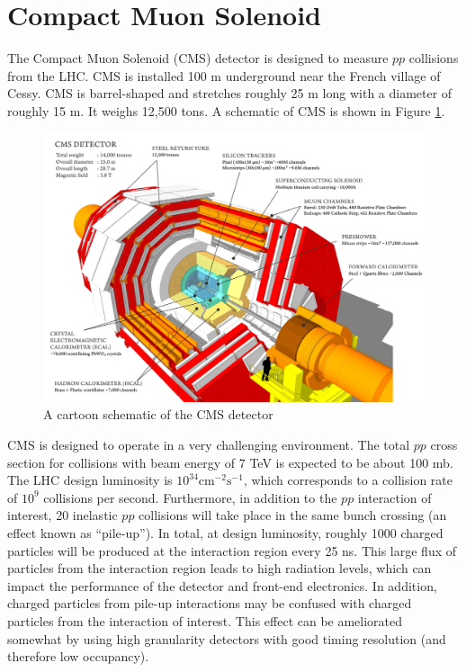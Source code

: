 \section{Compact Muon Solenoid}
\label{ch:cms}

The Compact Muon Solenoid (CMS) detector is 
designed to measure $pp$ collisions from the LHC.
CMS is installed 100 m underground near the French village
of Cessy.  CMS is barrel-shaped and stretches roughly 25 m long with
a diameter of roughly 15 m.  It weighs 12,500 tons.
A schematic of CMS is shown in Figure \ref{fig:cms}.

\begin{figure}
  \centering
  \includegraphics[width=\textwidth]{tex/cms/fig/cms.png}
  \caption{A cartoon schematic of the CMS detector}
  \label{fig:cms}
\end{figure}

CMS is designed to operate in a very challenging environment.
The total $pp$ cross section for collisions with 
beam energy of 7 TeV is expected to be about 100 mb.
The LHC design luminosity is $10^{34}\text{cm}^{-2}\text{s}^{-1}$, which
corresponds to a collision rate of $10^9$ collisions per second.
Furthermore, in addition to the $pp$ interaction of interest,
20 inelastic $pp$ collisions will take place in the same
bunch crossing (an effect known as ``pile-up'').  
In total, at design luminosity, roughly 1000 charged particles 
will be produced at the interaction region every 25 ns.
This large flux of particles from the interaction region leads to
high radiation levels, which can impact the performance of the detector and front-end electronics.
In addition, charged particles from pile-up
interactions may be confused with charged particles from the interaction
of interest.  This effect can be ameliorated somewhat by using
high granularity detectors with good timing resolution (and therefore low occupancy).

